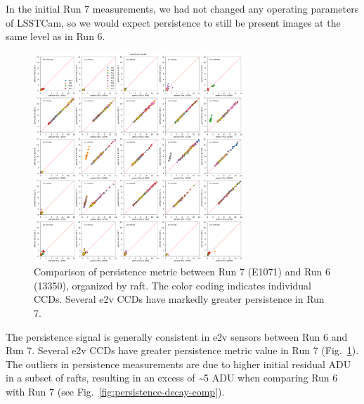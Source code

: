 In the initial Run 7 measurements, we had not changed any operating
parameters of LSSTCam, so we would expect persistence to still be
present images at the same level as in Run 6.

\begin{figure}[ht]
\begin{centering}
\includegraphics[width=0.7\textwidth]{figures/baselineCharacterization/13550_E1071_persist_inset.png}
\caption{Comparison of persistence metric between Run 7 (E1071) and Run 6 (13350), organized by raft.  The color coding indicates individual CCDs.  Several e2v CCDs have markedly greater persistence in Run 7.}
\label{fig:persistence-comp}
\end{centering}
\end{figure}

The persistence signal is generally consistent in e2v sensors between Run 6 and Run 7. Several e2v CCDs have greater persistence metric value in Run 7 (Fig.~\ref{fig:persistence-comp}). The outliers in
persistence measurements are due to higher initial residual ADU in a subset of rafts, resulting in an excess of \textasciitilde5 ADU when comparing Run 6 with Run 7 (see Fig.~\ref{fig:persistence-decay-comp}).


